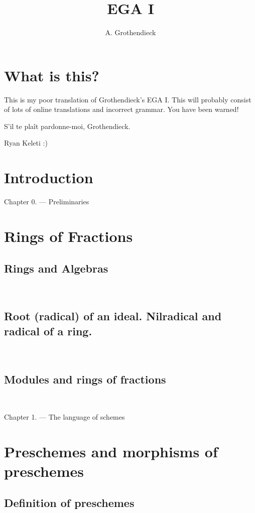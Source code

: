 \documentclass[10pt]{amsart}
\title{EGA I}
\author{A. Grothendieck}
\date{ }
\begin{document}
\maketitle
\tableofcontents{}

\section*{What is this?}

This is my poor translation of Grothendieck's EGA I. This
will probably consist of lots of online translations and incorrect grammar.
You have been warned!

S'il te pla\^it pardonne-moi, Grothendieck.

Ryan Keleti :)

\section*{Introduction}


Chapter 0. --- Preliminaries
\section*{Rings of Fractions}
\subsection*{Rings and Algebras}\mbox{}\\

\subsection*{Root (radical) of an ideal. Nilradical and radical of a ring.}\mbox{}\\

\subsection*{Modules and rings of fractions}\mbox{}\\


\newpage

Chapter 1. --- The language of schemes
\section*{Preschemes and morphisms of preschemes}
\subsection*{Definition of preschemes}\mbox{}\\

\end{document}
